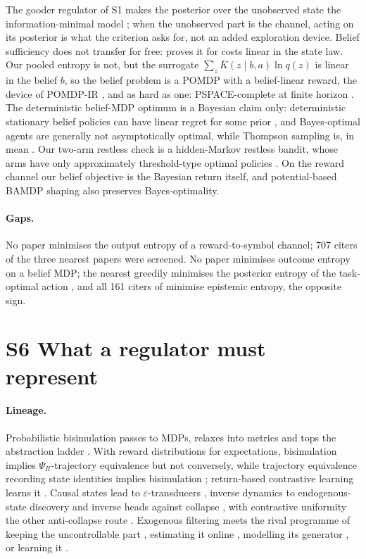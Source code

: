 \documentclass[10pt]{article}
\begin{document}
The gooder regulator of S1 makes the posterior over the unobserved state the information-minimal model \citep{Wentworth-fixing21}; when the unobserved part is the channel, acting on its posterior is what the criterion asks for, not an added exploration device. Belief sufficiency does not transfer for free: \citet{Astrom-optimal65} proves it for costs linear in the state law. Our pooled entropy is not, but the surrogate $\sum_z \bar K(z\mid b,a)\ln q(z)$ is linear in the belief $b$, so the belief problem is a POMDP with a belief-linear reward, the device of POMDP-IR \citep{Spaan-decisiontheoretic15}, and as hard as one: PSPACE-complete at finite horizon \citep{Papadimitriou-complexity87}. The deterministic belief-MDP optimum is a Bayesian claim only: deterministic stationary belief policies can have linear regret for some prior \citep{Russo-learning14}, and Bayes-optimal agents are generally not asymptotically optimal, while Thompson sampling is, in mean \citep{Leike-thompson16}. Our two-arm restless check is a hidden-Markov restless bandit, whose arms have only approximately threshold-type optimal policies \citep{Meshram-whittle16}. On the reward channel our belief objective is the Bayesian return itself, and potential-based BAMDP shaping also preserves Bayes-optimality.

\paragraph{Gaps.}
No paper minimises the output entropy of a reward-to-symbol channel; 707 citers of the three nearest papers were screened. No paper minimises outcome entropy on a belief MDP; the nearest greedily minimises the posterior entropy of the task-optimal action \citep{Greigarn-taskoriented19}, and all 161 citers of \citet{Araya-pomdp10} minimise epistemic entropy, the opposite sign.

\section{S6 What a regulator must represent}

\paragraph{Lineage.}
Probabilistic bisimulation passes to MDPs, relaxes into metrics and tops the abstraction ladder \citep{Li-towards06}. With reward distributions for expectations, bisimulation implies $\Psi_R$-trajectory equivalence but not conversely, while trajectory equivalence recording state identities implies bisimulation \citep{Castro-equivalence09}; return-based contrastive learning learns it \citep{Liu-returnbased21}. Causal states lead to $\varepsilon$-transducers \citep{Barnett-computational15}, inverse dynamics to endogenous-state discovery \citep{Lamb-guaranteed23} and inverse heads against collapse \citep{Ivashkov-smwm26}, with contrastive uniformity the other anti-collapse route \citep{Wang-understanding20}. Exogenous filtering \citep{Dietterich-discovering18} meets the rival programme of keeping the uncontrollable part \citep{Kooi-disentangled23}, estimating it online \citep{Kumar-rma21}, modelling its generator \citep{Sontag-adaptation03}, or learning it \citep{Qasem-adaptive22}.
\end{document}

